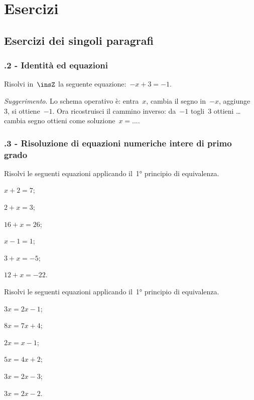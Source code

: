 
\section{Esercizi}
\subsection{Esercizi dei singoli paragrafi}
\subsubsection*{\thechapter.2 - Identità ed equazioni}

\begin{esercizio}
\label{ese:13.1}
Risolvi in~$\insZ$ la seguente equazione:~$-x+3=-1$.

\emph{Suggerimento}. Lo schema operativo è: entra~$x$, cambia il segno in~$-x$, aggiunge~$3$, si ottiene~$-1$.
Ora ricostruisci il cammino inverso: da~$-1$ togli~$3$ ottieni \ldots cambia segno ottieni come soluzione~$x = \ldots$.
\end{esercizio}

\subsubsection*{\thechapter.3 - Risoluzione di equazioni numeriche intere di primo grado}

\begin{esercizio}
\label{ese:13.2}
Risolvi le seguenti equazioni applicando il~1° principio di equivalenza.
\begin{multicols}{3}
\begin{enumeratea}
\spazielenx
 \item $x+2=7$;
 \item $2+x=3$;
 \item $16+x=26$;
 \item $x-1=1$;
 \item $3+x=-5$;
 \item $12+x=-22$.
\end{enumeratea}
\end{multicols}
\end{esercizio}

\begin{esercizio}
\label{ese:13.3}%
Risolvi le seguenti equazioni applicando il~1° principio di equivalenza.
\begin{multicols}{3}
\begin{enumeratea}
\spazielenx
 \item $3x=2x-1$;
 \item $8x=7x+4$;
 \item $2x=x-1$;
 \item $5x=4x+2$;
 \item $3x=2x-3$;
 \item $3x=2x-2$.
\end{enumeratea}
\end{multicols}
\end{esercizio}

